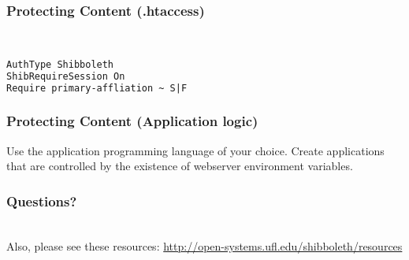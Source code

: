 \begin{frame}[fragile]
\frametitle{Protecting Content (.htaccess)}
 \\
\begin{lstlisting}[language=XML,basicstyle=\ttfamily \small]
AuthType Shibboleth
ShibRequireSession On
Require primary-affliation ~ S|F
\end{lstlisting}
\end{frame}

\begin{frame}[fragile]
\frametitle{Protecting Content (Application logic)}
Use the application programming language of your choice. Create applications that are controlled by the existence of webserver environment variables.
\end{frame}

\begin{frame}
\frametitle{Questions?}
 \\
\bigskip
Also, please see these resources: \url{http://open-systems.ufl.edu/shibboleth/resources}
\end{frame}


